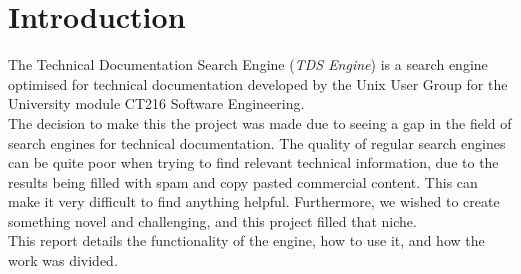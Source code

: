 \section{Introduction}
The Technical Documentation Search Engine (\textit{TDS Engine}) is a search engine optimised for technical documentation developed by the Unix User Group for the University module CT216 Software Engineering. \\
The decision to make this the project was made due to seeing a gap in the field of search engines for technical documentation. The quality of regular search engines can be quite poor when trying to find relevant technical information, due to the results being filled with spam and copy pasted commercial content. This can make it very difficult to find anything helpful. Furthermore, we wished to create something novel and challenging, and this project filled that niche. \\

This report details the functionality of the engine, how to use it, and how the work was divided. 
